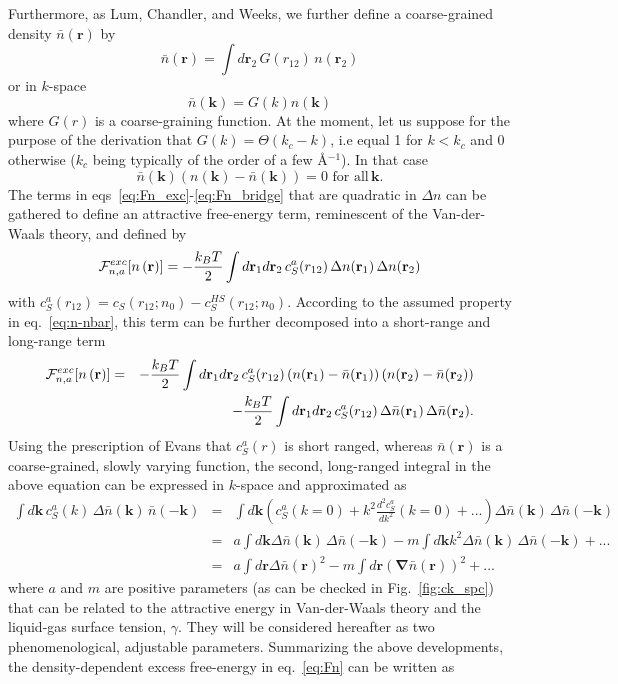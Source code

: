 \documentclass[aip,jcp,showpacs,amsmath,amssymb,superscriptaddress]{revtex4-1}
\newcommand{\be}{\begin{equation}}
\newcommand{\ee}{\end{equation}}
\newcommand{\bea}{\begin{eqnarray}}
\newcommand{\eea}{\end{eqnarray}}
\newcommand{\nn}{\nonumber}
\newcommand{\kBTotwo}{\frac{k_BT}{2}}
\newcommand{\RR}{\mathbf{r}}
\newcommand{\rr}{\mathbf{r}}
\newcommand{\kk}{\mathbf{k}}
\newcommand{\rhon}{{n\left({\mathbf r}\right)}}
\newcommand{\F}{{\cal F}}
\newcommand{\rhonbar}{\bar{n}({\mathbf r})}
\newcommand{\nbar}{\bar{n}}
\begin{document}
Furthermore, as Lum, Chandler, and Weeks\cite{lum99}, we further define a coarse-grained density $\rhonbar$ by
\be 
\rhonbar = \int d\rr_2 \, G(r_{12}) \, n(\rr_2)
\label{eq:rhobar}
\ee
or in $k$-space
\be
\nbar(\kk) = G(k) n(\kk)
\ee
where $G(r)$ is a coarse-graining function. At the moment, let us suppose for the purpose of the derivation that $G(k) = \Theta(k_c-k)$, i.e equal 1 for $k < k_c$ and 0 otherwise ($k_c$ being typically of the order of a few \AA$^{-1}$). In that case 
\be
\nbar(\kk) (n(\kk) - \nbar(\kk) ) = 0 \, \, \textrm{for all}\,  \kk.
\label{eq:n-nbar}
\ee
The  terms in eqs~\ref{eq:Fn_exc}-\ref{eq:Fn_bridge} that are quadratic in $\Delta n$ can be gathered to define an attractive free-energy term, reminescent of the Van-der-Waals theory, and defined by
\be
\F_{n,a}^{exc}[\rhon]  =  -\kBTotwo   \int d\rr_1d\rr_2  \, c_S^{a}(r_{12}) \,  \Delta n(\rr_1) \, \Delta n(\rr_2) 
\ee
with $c_S^{a}(r_{12}) =  c_S(r_{12};n_0) - c_S^{HS}(r_{12};n_0)$. According to the assumed property in eq.~\ref{eq:n-nbar}, this term can be further decomposed into a short-range and long-range term
\bea
\F_{n,a}^{exc}[\rhon] & = &  -\frac{k_BT}{2} \int d\rr_1 d\rr_2 \, c_S^{a}(r_{12}) \, (n(\rr_1) - \nbar(\rr_1)) \,  (n(\rr_2) - \nbar(\rr_2)) \nn \\
& &  -\kBTotwo \int d\rr_1d\rr_2 \, c_S^{a}(r_{12}) \, \Delta \nbar(\rr_1) \,  \Delta \nbar(\rr_2).
\eea
 Using the prescription of Evans\cite{evans79,evans92} that $c_S^a(r)$ is short ranged, whereas $\nbar(\rr)$ is a coarse-grained, slowly varying function, the second, long-ranged integral in the above equation can be expressed in $k$-space and approximated as 
\bea
\int d\kk \, c_S^a(k) \, \Delta \nbar(\kk) \, \nbar(-\kk) &= & \int d\kk  \left(  c_S^a(k=0) + k^2 \frac{d^2 c_S^a}{dk^2}(k=0) + ... \right) \Delta \nbar(\kk) \, \Delta \nbar(-\kk) \nn \\
& = &   a \int d\kk \Delta \nbar(\kk) \, \Delta \nbar(-\kk) - m \int d\kk k^2 \Delta \nbar(\kk) \, \Delta \nbar(-\kk) + ...  \nn \\
&= &  a \int d\rr \Delta\nbar(\RR)^2 -  m \int d\rr \left( \mathbf{\nabla}  \nbar(\RR) \right)^2  + ...
\label{eq:F_exc_expansion}
\eea
where $a$ and $m$ are positive parameters (as can be checked in Fig.~\ref{fig:ck_spc}) that can be related to the attractive energy in Van-der-Waals theory and the liquid-gas surface tension, $\gamma$. They will be considered hereafter as two phenomenological, adjustable parameters. Summarizing the above developments, the density-dependent excess free-energy in eq.~\ref{eq:Fn} can be written as
\end{document}
